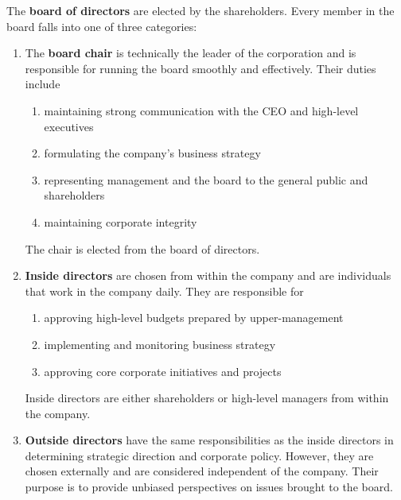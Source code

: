 \documentclass{article}
\begin{document}
    \begin{definition}
      \label{def:board-of-directors}
      The \textbf{board of directors} are elected by the shareholders. Every member in the board falls into one of three categories: 
      \begin{enumerate}
        \item The \textbf{board chair} is technically the leader of the corporation and is responsible for running the board smoothly and effectively. Their duties include
        \begin{enumerate}
          \item maintaining strong communication with the CEO and high-level executives
          \item formulating the company's business strategy
          \item representing management and the board to the general public and shareholders
          \item maintaining corporate integrity
        \end{enumerate}
        The chair is elected from the board of directors. 

        \item \textbf{Inside directors} are chosen from within the company and are individuals that work in the company daily. They are responsible for
        \begin{enumerate}
          \item approving high-level budgets prepared by upper-management
          \item implementing and monitoring business strategy
          \item approving core corporate initiatives and projects
        \end{enumerate}
        Inside directors are either shareholders or high-level managers from within the company. 

        \item \textbf{Outside directors} have the same responsibilities as the inside directors in determining strategic direction and corporate policy. However, they are chosen externally and are considered independent of the company. Their purpose is to provide unbiased perspectives on issues brought to the board. 
      \end{enumerate}
    \end{definition}
\end{document}
